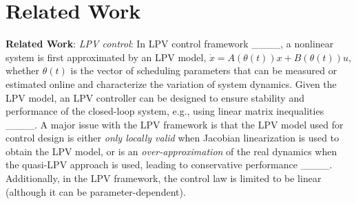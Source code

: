 \section{Related Work}
{\bf Related Work}: {\it LPV control}: In LPV control framework ____, a nonlinear system is first approximated by an LPV model, $\dot x = A(\theta(t))x+ B(\theta(t))u$, whether $\theta(t)$ is the vector of scheduling parameters that can be measured or estimated online 
 and characterize the variation of system dynamics. 
 Given the LPV model, an LPV controller can be designed to ensure stability and performance of the closed-loop system, e.g., using linear matrix inequalities ____. A major issue with the LPV framework is that the LPV model used for control design is either {\it only locally valid} when Jacobian linearization is used to obtain the LPV model, or is an {\it over-approximation} of the real dynamics when the quasi-LPV approach is used, leading to conservative performance ____. 
 Additionally,  in the LPV framework, the control law is limited to be linear (although it can be parameter-dependent). 



